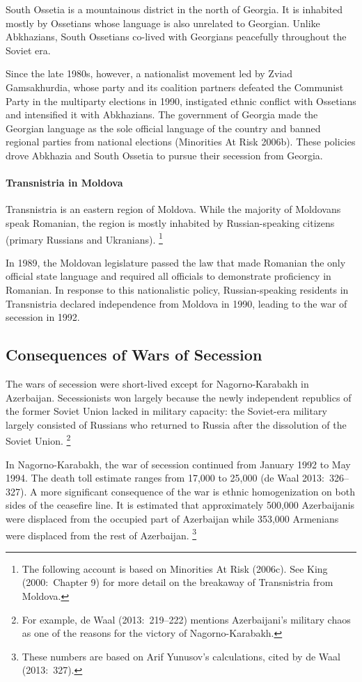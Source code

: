 \documentclass[12pt,a4paper]{article}%
\begin{document}
South Ossetia is a mountainous district in the north of Georgia. 
It is inhabited mostly by Ossetians whose language is also unrelated to Georgian. 
Unlike Abkhazians, South Ossetians co-lived with Georgians peacefully throughout the Soviet era.

Since the late 1980s, however, a nationalist movement led by Zviad Gamsakhurdia, whose party and its coalition partners defeated the Communist Party in the multiparty elections in 1990, instigated ethnic conflict with Ossetians and intensified it with Abkhazians.
The government of Georgia made the Georgian language as the sole official language of the country and banned regional parties from national elections (Minorities At Risk 2006b).
These policies drove Abkhazia and South Ossetia to pursue their secession from Georgia.

\paragraph{Transnistria in Moldova}
Transnistria is an eastern region of Moldova. While the majority of Moldovans speak Romanian, the region is mostly inhabited by Russian-speaking citizens (primary Russians and Ukranians).%
\footnote{
	The following account is based on Minorities At Risk (2006c). See King (2000:\ Chapter 9) for more detail on the breakaway of Transnistria from Moldova.
} 

In 1989, the Moldovan legislature passed the law that made Romanian the only official state language and required all officials to demonstrate proficiency in Romanian. 
In response to this nationalistic policy, Russian-speaking residents in Transnistria declared independence from Moldova in 1990, leading to the war of secession in 1992.%
\subsection{Consequences of Wars of Secession}
The wars of secession were short-lived except for Nagorno-Karabakh in Azerbaijan. 
Secessionists won largely because the newly independent republics of the former Soviet Union lacked in military capacity: the Soviet-era military largely consisted of Russians who returned to Russia after the dissolution of the Soviet Union.%
\footnote{
	For example, de Waal (2013:\ 219--222) mentions Azerbaijani's military chaos as one of the reasons for the victory of Nagorno-Karabakh.
}

In Nagorno-Karabakh, the war of secession continued from January 1992 to May 1994. The death toll estimate ranges from 17,000 to 25,000 (de Waal 2013:\ 326--327). A more significant consequence of the war is ethnic homogenization on both sides of the ceasefire line. 
It is estimated that approximately 500,000 Azerbaijanis were displaced from the occupied part of Azerbaijan while 353,000 Armenians were displaced from the rest of Azerbaijan.%
\footnote{
	These numbers are based on Arif Yunusov's calculations, cited by de Waal (2013:\ 327).
}
\end{document}
